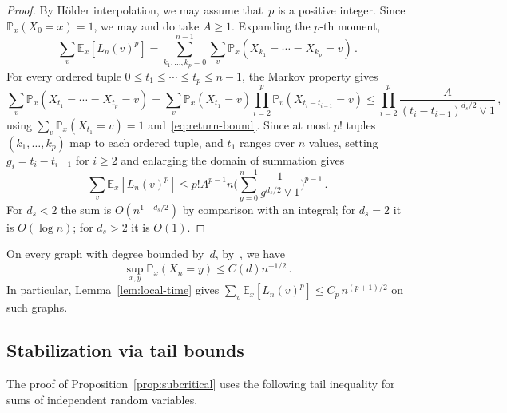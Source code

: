 \documentclass[11pt]{amsart}
\theoremstyle{plain}
\theoremstyle{definition}
\newcommand{\E}{\mathbb{E}}
\renewcommand{\P}{\mathbb{P}}
\begin{document}
	\begin{proof}
		By H\"older interpolation, we may assume that~$p$ is a positive integer.
		Since $\P_x(X_0=x)=1$, we may and do take $A\geq 1$.
		Expanding the $p$-th moment,
		\[
		\sum_v \E_x[L_n(v)^p]
		= \sum_{k_1,\ldots,k_p=0}^{n-1}
		\sum_v \P_x(X_{k_1} = \cdots = X_{k_p} = v)\,.
		\]
		For every ordered tuple $0 \leq t_1 \leq \cdots \leq t_p \leq n-1$,
		the Markov property gives
		\[
		\sum_v \P_x(X_{t_1} = \cdots = X_{t_p} = v)
		= \sum_v \P_x(X_{t_1}=v)\prod_{i=2}^{p} \P_v(X_{t_i - t_{i-1}}=v)
		\leq \prod_{i=2}^{p} \frac{A}{(t_i - t_{i-1})^{d_s/2} \vee 1}\,,
		\]
		using $\sum_v \P_x(X_{t_1}=v) = 1$ and~\eqref{eq:return-bound}.
		Since at most $p!$ tuples $(k_1,\ldots,k_p)$ map to each ordered tuple,
		and $t_1$ ranges over $n$ values, setting $g_i = t_i - t_{i-1}$
		for $i \geq 2$ and enlarging the domain of summation gives
		\[
		\sum_v \E_x[L_n(v)^p]
		\leq p! A^{p-1} n
		\biggl(\sum_{g=0}^{n-1} \frac{1}{g^{d_s/2} \vee 1}\biggr)^{p-1}\,.
		\]
		For $d_s<2$ the sum is $O(n^{1-d_s/2})$ by comparison with an integral; for $d_s=2$ it is $O(\log n)$; for $d_s>2$ it is $O(1)$.
		\qedhere
	\end{proof}
	
	On every graph with degree bounded by~$d$, by~\citet[Example~5.14]{Grigoryan},
	we have
	\begin{equation}
		\label{eq:heat-kernel-upper-bound}
		\sup_{x,y} \P_x(X_n = y) \leq C(d) n^{-1/2}\,.
	\end{equation}
	In particular, Lemma~\ref{lem:local-time} gives $\sum_v\E_x[L_n(v)^p]\leq C_p\,n^{(p+1)/2}$ on such graphs.
	
	\subsection{Stabilization via tail bounds}
	
	The proof of Proposition~\ref{prop:subcritical} uses the following tail inequality for sums of independent random variables.
	
\end{document}
